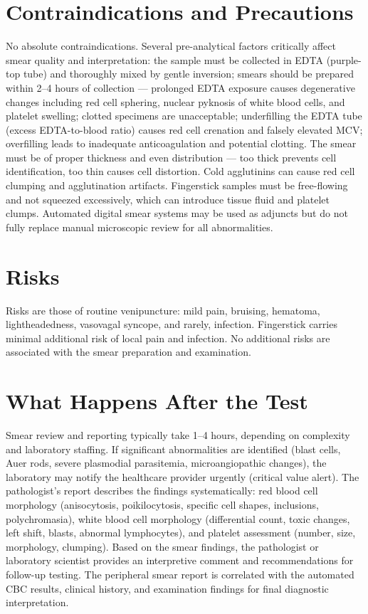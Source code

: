\section*{Contraindications and Precautions}
No absolute contraindications. Several pre-analytical factors critically affect smear quality and interpretation: the sample must be collected in EDTA (purple-top tube) and thoroughly mixed by gentle inversion; smears should be prepared within 2--4 hours of collection --- prolonged EDTA exposure causes degenerative changes including red cell sphering, nuclear pyknosis of white blood cells, and platelet swelling; clotted specimens are unacceptable; underfilling the EDTA tube (excess EDTA-to-blood ratio) causes red cell crenation and falsely elevated MCV; overfilling leads to inadequate anticoagulation and potential clotting. The smear must be of proper thickness and even distribution --- too thick prevents cell identification, too thin causes cell distortion. Cold agglutinins can cause red cell clumping and agglutination artifacts. Fingerstick samples must be free-flowing and not squeezed excessively, which can introduce tissue fluid and platelet clumps. Automated digital smear systems may be used as adjuncts but do not fully replace manual microscopic review for all abnormalities.

\section*{Risks}
Risks are those of routine venipuncture: mild pain, bruising, hematoma, lightheadedness, vasovagal syncope, and rarely, infection. Fingerstick carries minimal additional risk of local pain and infection. No additional risks are associated with the smear preparation and examination.

\section*{What Happens After the Test}
Smear review and reporting typically take 1--4 hours, depending on complexity and laboratory staffing. If significant abnormalities are identified (blast cells, Auer rods, severe plasmodial parasitemia, microangiopathic changes), the laboratory may notify the healthcare provider urgently (critical value alert). The pathologist's report describes the findings systematically: red blood cell morphology (anisocytosis, poikilocytosis, specific cell shapes, inclusions, polychromasia), white blood cell morphology (differential count, toxic changes, left shift, blasts, abnormal lymphocytes), and platelet assessment (number, size, morphology, clumping). Based on the smear findings, the pathologist or laboratory scientist provides an interpretive comment and recommendations for follow-up testing. The peripheral smear report is correlated with the automated CBC results, clinical history, and examination findings for final diagnostic interpretation.

